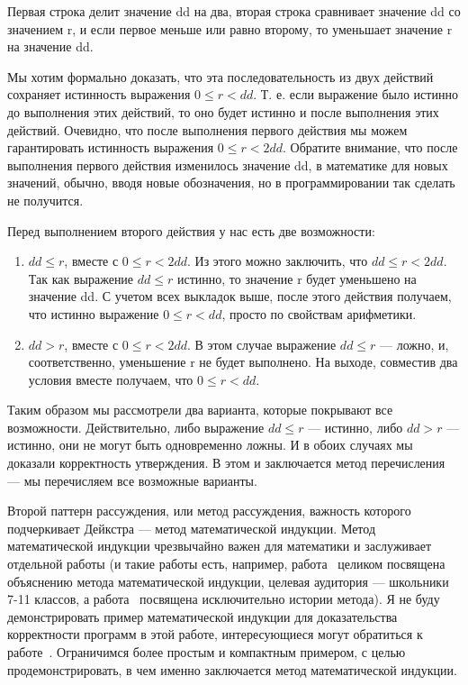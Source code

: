 Первая строка делит значение dd на два, вторая строка сравнивает значение dd со значением r, и если первое меньше или равно второму, то уменьшает значение r на значение dd.

Мы хотим формально доказать, что эта последовательность из двух действий сохраняет истинность выражения $0 \le r < dd$. Т. е. если выражение было истинно до выполнения этих действий, то оно будет истинно и после выполнения этих действий. Очевидно, что после выполнения первого действия мы можем гарантировать истинность выражения $0 \le r < 2 dd$. Обратите внимание, что после выполнения первого действия изменилось значение dd, в математике для новых значений, обычно, вводя новые обозначения, но в программировании так сделать не получится.

Перед выполнением второго действия у нас есть две возможности:
\begin{enumerate}
  \item $dd \le r$, вместе с $0 \le r < 2 dd$. Из этого можно заключить, что $dd \le r < 2 dd$. Так как выражение $dd \le r$ истинно, то значение r будет уменьшено на значение dd. С учетом всех выкладок выше, после этого действия получаем, что истинно выражение $0 \le r < dd$, просто по свойствам арифметики.
  \item $dd > r$, вместе с $0 \le r < 2 dd$. В этом случае выражение $dd \le r$ — ложно, и, соответственно, уменьшение r не будет выполнено. На выходе, совместив два условия вместе получаем, что $0 \le r < dd$.
\end{enumerate}

Таким образом мы рассмотрели два варианта, которые покрывают все возможности. Действительно, либо выражение $dd \le r$ — истинно, либо $dd > r$ — истинно, они не могут быть одновременно ложны. И в обоих случаях мы доказали корректность утверждения. В этом и заключается метод перечисления — мы перечисляем все возможные варианты.

Второй паттерн рассуждения, или метод рассуждения, важность которого подчеркивает Дейкстра — метод математической индукции. Метод математической индукции чрезвычайно важен для математики и заслуживает отдельной работы (и такие работы есть, например, работа~\cite{Shen} целиком посвящена объяснению метода математической индукции, целевая аудитория — школьники 7-11 классов, а работа~\cite{Bussey:1917:IND} посвящена исключительно истории метода). Я не буду демонстрировать пример математической индукции для доказательства корректности программ в этой работе, интересующиеся могут обратиться к работе~\cite{Dijkstra:1972:CIN}. Ограничимся более простым и компактным примером, с целью продемонстрировать, в чем именно заключается метод математической индукции.

